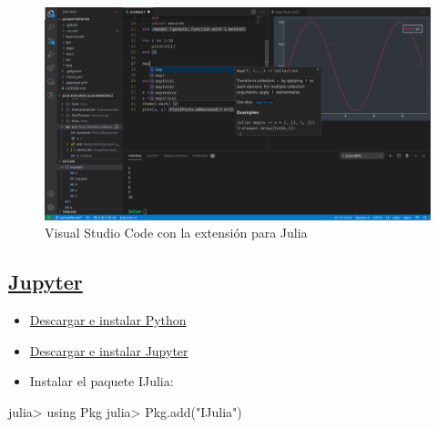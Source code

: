 \documentclass[
  letterpaper,
  DIV=11,
  numbers=noendperiod]{scrreprt}
\newenvironment{Shaded}{\begin{snugshade}}{\end{snugshade}}
\newcommand{\BuiltInTok}[1]{\textcolor[rgb]{0.00,0.23,0.31}{#1}}
\newcommand{\FunctionTok}[1]{\textcolor[rgb]{0.28,0.35,0.67}{#1}}
\newcommand{\ImportTok}[1]{\textcolor[rgb]{0.00,0.46,0.62}{#1}}
\newcommand{\NormalTok}[1]{\textcolor[rgb]{0.00,0.23,0.31}{#1}}
\newcommand{\OperatorTok}[1]{\textcolor[rgb]{0.37,0.37,0.37}{#1}}
\newcommand{\StringTok}[1]{\textcolor[rgb]{0.13,0.47,0.30}{#1}}
\providecommand{\tightlist}{%
  \setlength{\itemsep}{0pt}\setlength{\parskip}{0pt}}\usepackage{longtable,booktabs,array}
\begin{document}
\begin{figure}

{\centering \includegraphics{./img/vscode.png}

}

\caption{Visual Studio Code con la extensión para Julia}

\end{figure}

\hypertarget{jupyter}{%
\subsection{\texorpdfstring{\href{https://jupyter.org/}{Jupyter}}{Jupyter}}\label{jupyter}}

\begin{itemize}
\tightlist
\item
  \href{https://www.python.org/downloads/}{Descargar e instalar Python}
\item
  \href{https://jupyter.org/install}{Descargar e instalar Jupyter}
\item
  Instalar el paquete IJulia:
\end{itemize}

\begin{Shaded}
\begin{Highlighting}[]
\NormalTok{julia}\OperatorTok{\textgreater{}} \ImportTok{using} \BuiltInTok{Pkg}
\NormalTok{julia}\OperatorTok{\textgreater{}} \BuiltInTok{Pkg}\NormalTok{.}\FunctionTok{add}\NormalTok{(}\StringTok{"IJulia"}\NormalTok{)}
\end{Highlighting}
\end{Shaded}
\end{document}
